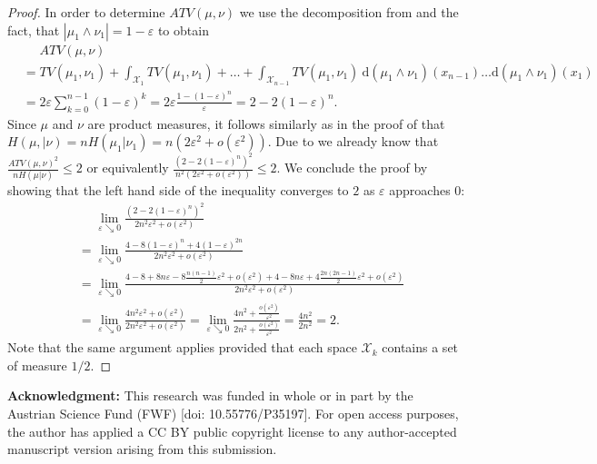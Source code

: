 \documentclass[10pt, A4paper]{amsart}
\theoremstyle{definition}
\newcommand{\X}{\mathcal X}
\numberwithin{equation}{section}
\begin{document}
\begin{proof}
    In order to determine $ATV(\mu,\nu)$ we use the decomposition from  and the fact, that $|\mu_1 \wedge \nu_1| = 1-\varepsilon$ to obtain
    \begin{align*}
        & \phantom{=} ATV(\mu,\nu) \\
        & = TV(\mu_1,\nu_1)+\int_{\X_1} TV(\mu_1,\nu_1)+\ldots +\int_{\X_{n-1}} TV(\mu_1,\nu_1) \ \mathrm{d}(\mu_1 \wedge \nu_1)(x_{n-1}) \ldots \mathrm{d}(\mu_1 \wedge \nu_1)(x_1) \\
        & = 2\varepsilon \sum_{k=0}^{n-1}(1-\varepsilon)^k  = 2\varepsilon \frac{1-(1-\varepsilon)^n}{\varepsilon}  = 2-2(1-\varepsilon)^n.
    \end{align*}
    Since $\mu$ and $\nu$ are product measures, it follows similarly as in the proof of  that $H(\mu,|\nu) = n H(\mu_1|\nu_1) = n (2\varepsilon^2+o(\varepsilon^2))$. Due to  we  already know that $\frac{ATV(\mu,\nu)^2}{nH(\mu|\nu)}\leq2$ or equivalently $\frac{(2-2(1-\varepsilon)^n)^2}{n^2(2\varepsilon^2+o(\varepsilon^2))} \leq 2$. We conclude the proof by showing that the left hand side of the inequality converges to $2$ as $\varepsilon$ approaches $0$:
    \begin{align*}
        & \phantom{=} \lim_{\varepsilon \searrow 0} \frac{(2-2(1-\varepsilon)^n)^2}{2n^2\varepsilon^2+o(\varepsilon^2)} \\
        & = \lim_{\varepsilon \searrow 0} \frac{4-8(1-\varepsilon)^n+4(1-\varepsilon)^{2n}}{2n^2\varepsilon^2+o(\varepsilon^2)} \\ 
        & = \lim_{\varepsilon \searrow 0} \frac{4-8+8n\varepsilon-8\frac{n(n-1)}{2}\varepsilon^2+o(\varepsilon^2)+4-8n\varepsilon+4\frac{2n(2n-1)}{2}\varepsilon^2+o(\varepsilon^2)}{2n^2\varepsilon^2+o(\varepsilon^2)} \\
        & = \lim_{\varepsilon \searrow 0} \frac{4n^2\varepsilon^2+o(\varepsilon^2)}{2n^2\varepsilon^2+o(\varepsilon^2)} 
         = \lim_{\varepsilon \searrow 0} \frac{4n^2+\frac{o(\varepsilon^2)}{\varepsilon^2}}{2n^2+\frac{o(\varepsilon^2)}{\varepsilon^2}} 
         = \frac{4n^2}{2n^2} = 2.
    \end{align*}
    Note that the same argument applies provided that each space $\X_k$ contains a set of measure $1/2$.
\end{proof}



\medskip
\noindent
{\bf Acknowledgment:}
 This research was funded  in whole or in part by the Austrian Science Fund (FWF) [doi: 10.55776/P35197]. For open access purposes, the author has applied a CC BY public copyright license to any author-accepted manuscript version arising from this submission.	
    
 

\end{document}

